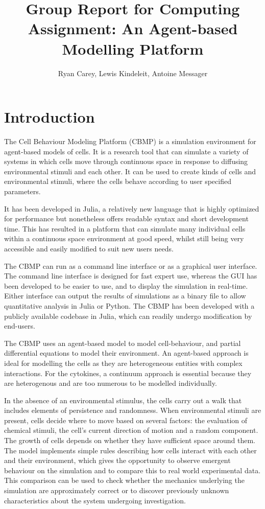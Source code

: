 \documentclass[12pt]{article}
\title{Group Report for Computing Assignment: An Agent-based Modelling Platform}
\author{Ryan Carey, Lewis Kindeleit, Antoine Messager}
\begin{document}
\maketitle

\newpage
\tableofcontents
\newpage

\section{Introduction}
The Cell Behaviour Modeling Platform (CBMP) is a simulation environment 
for agent-based models of cells. It is a research tool that can simulate 
a variety of systems in which cells move through continuous space in 
response to diffusing environmental stimuli and each other. It can be 
used to create kinds of cells and environmental stimuli, where the cells 
behave according to user specified parameters.

It has been developed in Julia, a relatively new language that is highly 
optimized for performance but nonetheless offers readable syntax and 
short development time. This has resulted in a platform that can 
simulate many individual cells within a continuous space environment at 
good speed, whilst still being very accessible and easily modified to 
suit new users needs.

The CBMP can run as a command line interface or as a graphical user 
interface. The command line interface is designed for fast expert use, 
whereas the GUI has been developed to be easier to use, and to display 
the simulation in real-time. Either interface can output the results of 
simulations as a binary file to allow quantitative analysis in Julia or 
Python. The CBMP has been developed with a publicly available codebase 
in Julia, which can readily undergo modification by end-users.

The CBMP uses an agent-based model to model cell-behaviour, and partial 
differential equations to model their environment. An agent-based 
approach is ideal for modelling the cells as they are heterogeneous 
entities with complex interactions. For the cytokines, a continuum 
approach is essential because they are heterogenous and are too numerous 
to be modelled individually.\cite{kaul15}

In the absence of an environmental stimulus, the cells carry out a walk 
that includes elements of persistence and randomness.\cite{codling08} When environmental 
stimuli are present, cells decide where to move based on several 
factors: the evaluation of chemical stimuli, the cell's current 
direction of motion and a random component. The growth of cells depends 
on whether they have sufficient space around them. The model implements 
simple rules describing how cells interact with each other and their 
environment, which gives the opportunity to observe emergent behaviour 
on the simulation and to compare this to real world experimental data. 
This comparison can be used to check whether the mechanics underlying 
the simulation are approximately correct or to discover previously 
unknown characteristics about the system undergoing investigation.
\end{document}
